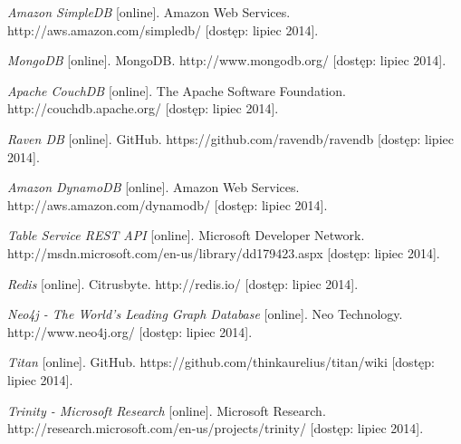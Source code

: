 \begin{thebibliography}{}
  \emph{Amazon SimpleDB} [online].
  Amazon Web Services.
  http://aws.amazon.com/simpledb/ [dostęp: lipiec 2014].
 
  \emph{MongoDB} [online].
  MongoDB.
  http://www.mongodb.org/ [dostęp: lipiec 2014].
 
  \emph{Apache CouchDB} [online].
  The Apache Software Foundation.
  http://couchdb.apache.org/ [dostęp: lipiec 2014].
 
  \emph{Raven DB} [online].
  GitHub.
  https://github.com/ravendb/ravendb [dostęp: lipiec 2014].
 
  \emph{Amazon DynamoDB} [online].
  Amazon Web Services.
  http://aws.amazon.com/dynamodb/ [dostęp: lipiec 2014].
 
  \emph{Table Service REST API} [online].
  Microsoft Developer Network.
  http://msdn.microsoft.com/en-us/library/dd179423.aspx [dostęp: lipiec 2014].
 
  \emph{Redis} [online].
  Citrusbyte.
  http://redis.io/ [dostęp: lipiec 2014].
 
  \emph{Neo4j - The World's Leading Graph Database} [online].
  Neo Technology.
  http://www.neo4j.org/ [dostęp: lipiec 2014].
 
  \emph{Titan} [online].
  GitHub.
  https://github.com/thinkaurelius/titan/wiki [dostęp: lipiec 2014].
 
  \emph{Trinity - Microsoft Research} [online].
  Microsoft Research.
  http://research.microsoft.com/en-us/projects/trinity/ [dostęp: lipiec 2014].
  
\end{thebibliography}
